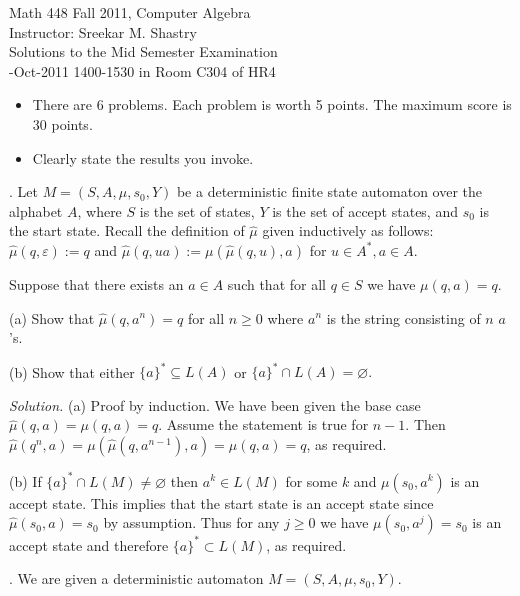 \documentclass[10pt,a4paper,reqno]{amsart}
\begin{document}


\noindent Math 448 Fall 2011, Computer Algebra\\
\noindent Instructor: Sreekar M. Shastry\\
\noindent Solutions to the Mid Semester Examination\\
-Oct-2011 1400-1530 in Room C304 of HR4

\bigskip

\begin{itemize}
    \item There are 6 problems. Each problem is worth 5 points. The maximum score is 30 points.
    \item Clearly state the results you invoke.
\end{itemize}

\bigskip

. Let $M = (S,A,\mu,s_0, Y)$ be a deterministic finite state
automaton over the alphabet $A$, where $S$ is the set of states, $Y$ is the set
of accept states, and $s_0$ is the start state.  Recall the definition of
$\widehat{\mu}$ given inductively as follows: $\widehat{\mu}(q, \varepsilon) :=
q$ and $\widehat{\mu}(q, ua) := \mu(\widehat{\mu}(q,u),a)$ for $u\in A^*, a\in
A$.

Suppose that there exists an $a\in A$ such that for all $q\in S$ we have
$\mu(q,a) = q$.

(a) Show that $\widehat{\mu}(q,a^n) = q$ for all $n \ge 0$ where $a^n$ is the
string consisting of $n$ $a$'s.

(b) Show that either $\{a\}^* \subseteq L(A)$ or $\{a\}^* \cap L(A) =
\varnothing.$

\bigskip

\emph{Solution.} (a) Proof by induction. We have been given the base case
$\widehat{\mu}(q,a) = \mu(q,a) = q$. Assume the statement is true for $n-1$.
Then $\widehat{\mu}(q^n,a) = \mu(\widehat{\mu}(q,a^{n-1}),a) = \mu(q,a) = q$,
as required.

(b) If $\{a\}^*\cap L(M) \neq \varnothing$ then $a^k\in L(M)$ for some $k$ and
$\mu(s_0, a^k)$ is an accept state. This implies that the start state is an
accept state since $\widehat{\mu}(s_0, a) = s_0$ by assumption. Thus for any $j
\ge 0$ we have $\mu(s_0,a^j) = s_0$ is an accept state and therefore \(\{a\}^*
\subset L(M)\), as required.

\bigskip

. We are given a deterministic automaton $M=(S,A,\mu,s_0, Y).$
\end{document}
